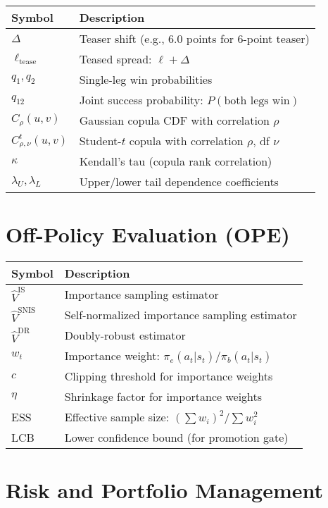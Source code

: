\begin{tabular}{ll}
\toprule
\textbf{Symbol}  & \textbf{Description} \\
\midrule
$\Delta$ & Teaser shift (e.g., 6.0 points for 6-point teaser) \\
$\ell_{\text{tease}}$ & Teased spread: $\ell + \Delta$ \\
$q_1, q_2$ & Single-leg win probabilities \\
$q_{12}$ & Joint success probability: $P(\text{both legs win})$ \\
$C_{\rho}(u,v)$ & Gaussian copula CDF with correlation $\rho$ \\
$C_{\rho,\nu}^t(u,v)$ & Student-$t$ copula with correlation $\rho$, df $\nu$ \\
$\kappa$ & Kendall's tau (copula rank correlation) \\
$\lambda_U, \lambda_L$ & Upper/lower tail dependence coefficients \\
\bottomrule
\end{tabular}

\section*{Off-Policy Evaluation (OPE)}

\begin{tabular}{ll}
\toprule
\textbf{Symbol}  & \textbf{Description} \\
\midrule
$\hat{V}^{\text{IS}}$ & Importance sampling estimator \\
$\hat{V}^{\text{SNIS}}$ & Self-normalized importance sampling estimator \\
$\hat{V}^{\text{DR}}$ & Doubly-robust estimator \\
$w_t$ & Importance weight: $\pi_e(a_t|s_t) / \pi_b(a_t|s_t)$ \\
$c$ & Clipping threshold for importance weights \\
$\eta$ & Shrinkage factor for importance weights \\
ESS & Effective sample size: $(\sum w_i)^2 / \sum w_i^2$ \\
LCB & Lower confidence bound (for promotion gate) \\
\bottomrule
\end{tabular}

\section*{Risk and Portfolio Management}

